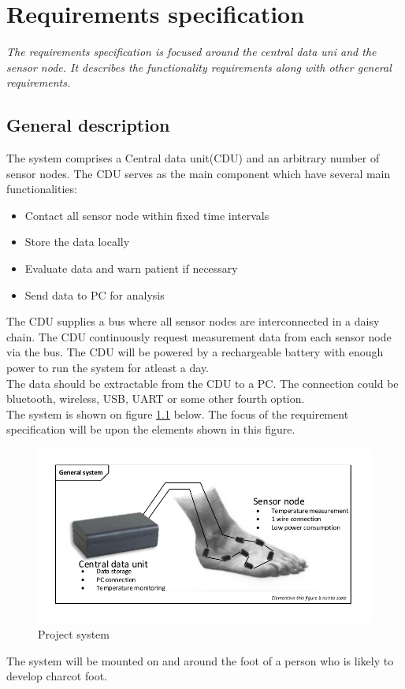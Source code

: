 \chapter{Requirements specification}
\textit{The requirements specification is focused around the central data uni and the sensor node. It describes the functionality requirements along with other general requirements.}
\section{General description}
The system comprises a Central data unit(CDU) and an arbitrary number of sensor nodes. The CDU serves as the main component which have several main functionalities:
\begin{itemize}
	\item Contact all sensor node within fixed time intervals
	\item Store the data locally
	\item Evaluate data and warn patient if necessary
	\item Send data to PC for analysis
\end{itemize}
The CDU supplies a bus where all sensor nodes are interconnected in a daisy chain.
The CDU continuously request measurement data from each sensor node via the bus. The CDU will be powered by a rechargeable battery with enough power to run the system for atleast a day.\\
The data should be extractable from the CDU to a PC. The connection could be bluetooth, wireless, USB, UART or some other fourth option.\\
The system is shown on figure \ref{fig:project_system} below. The focus of the requirement specification will be upon the elements shown in this figure.
\begin{figure}[H]
	\centering
	\includegraphics[width=.9\textwidth]{billeder/7requirementspec/GeneralSystem}
	\caption{Project system}
	\label{fig:project_system}
\end{figure}
The system will be mounted on and around the foot of a person who is likely to develop charcot foot. 
